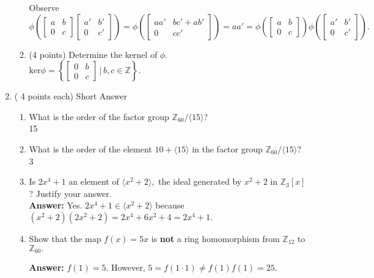 \documentclass[12pt]{article}
\renewcommand{\emph}[1]{\textsf{\textbf{#1}}}
\newcommand{\bbZ}{\mathbb{Z}}
\begin{document}
\begin{enumerate}
\begin{enumerate}
Observe\\

$\phi \left(\begin{bmatrix} a&b\\0&c \end{bmatrix} \begin{bmatrix} a'&b'\\0&c' \end{bmatrix} \right) = 
	\phi \left(\begin{bmatrix} aa'&bc'+ab'\\0&cc' \end{bmatrix} \right)=aa'=
	\phi \left(\begin{bmatrix} a&b\\0&c \end{bmatrix}\right)\phi\left( \begin{bmatrix} a'&b'\\0&c' \end{bmatrix} \right).$\\

	\vfill
	\item ({\small 4 points}) Determine the kernel of $\phi.$\\
	
	$\text{ker} \phi =\left\{ \begin{bmatrix} 0&b\\0&c \end{bmatrix} \,\big \vert \, b,c \in \bbZ \right\}.$
	\vfill
	\end{enumerate}

\item ({\small{ 4 points each}}) Short Answer
	\begin{enumerate}
	\item What is the order of the factor group $\bbZ_{60}/\langle 15 \rangle$?\\
	15
	\vfill
	\item What is the order of the element $10+\langle 15 \rangle$ in the factor group $\bbZ_{60}/\langle 15 \rangle$?\\
	3
	\vfill
	\item Is $2x^4+1$ an element of  $\langle x^2+2 \rangle,$  the ideal generated by $x^2+2$ in $\bbZ_3[x]$? Justify your answer.\\
	 \textbf{Answer:} Yes. $2x^4+1\in \langle x^2+2 \rangle$ because $(x^2+2)(2x^2+2)=2x^4+6x^2+4=2x^4+1.$
	\vfill
	\item Show that the map $f(x)=5x$ is \emph{not} a ring homomorphism from $\bbZ_{12}$ to $\bbZ_{60}.$
	
	\textbf{Answer:} $f(1)=5.$ However, $5=f(1 \cdot 1) \not=f(1)f(1)=25.$
	\vfill
	\end{enumerate}
\end{enumerate}
\end{document}
